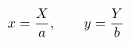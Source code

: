 \documentclass[preview]{standalone}
\begin{document}
\begin{align*}
\special{dvisvgm:raw <g id='unique000'>}x=\frac{X}{a},\qquad y=\frac{Y}{b}\special{dvisvgm:raw </g>}
\end{align*}
\end{document}
